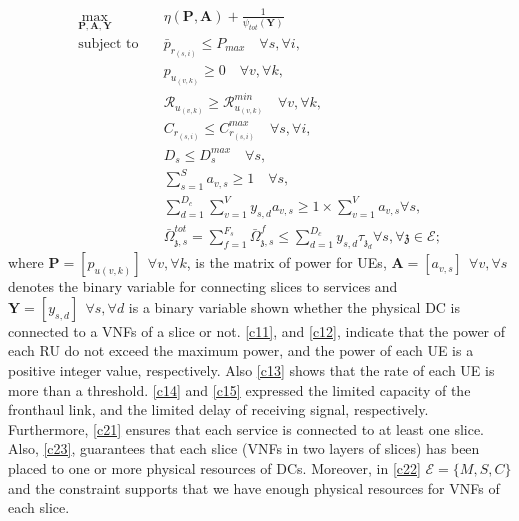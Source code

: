\documentclass[conference]{IEEEtran}
\begin{document}
\begin{subequations}
\begin{alignat}{4}
\max\limits_{\boldsymbol{P}, \boldsymbol{A}, \boldsymbol{Y} }   \quad &   \eta(\boldsymbol{P},\boldsymbol{A})+\frac{1}{\psi_{tot}(\boldsymbol{Y})} \\
\text{subject to} \quad  & \bar{p}_{r_{(s,i)}} \leq P_{max} \quad \forall s, \forall i,
 \label{c11} \\
&p_{u_{(v,k)}}  \geq 0  \quad \forall v, \forall k,\label{c12} \\
&\mathcal{R}_{u_{(v,k)}} \geq  \mathcal{R}_{u_{(v,k)}}^{min} \quad \forall v, \forall k,\label{c13} \\
&C_{r_{(s,i)}} \leq C_{r_{(s,i)}}^{max} \quad \forall s, \forall i, \label{c14}\\
&D_{s} \leq D_{s}^{max} \quad \forall s,\label{c15} \\
& \textstyle  \sum_{s=1}^{S}a_{v,s} \geq 1 \quad \forall s, \label{c21} \\
& \textstyle  \sum_{d=1}^{D_c}\sum_{v=1}^{V}y_{s,d}a_{v,s} \geq 1\times\sum_{v=1}^{V}a_{v,s} \forall s,\label{c23} \\
 &\textstyle  \bar{\Omega}_{\mathfrak{z},s}^{tot} = \sum_{f=1}^{F_s}\bar{\Omega}_{\mathfrak{z},s}^f \leq  \sum_{d=1}^{D_c} y_{s,d} \tau_{\mathfrak{z}_d}  \forall s, \forall \mathfrak{z}\in \mathcal{E}; \label{c22}
\end{alignat}
\label{constraints}
\end{subequations}
where $\boldsymbol{P} =[p_{u(v,k)}] \:\: \forall v , \forall k $, is the matrix of power for UEs, $\boldsymbol{A} =[a_{v,s}] \:\: \forall v , \forall s $ denotes the binary variable for connecting slices to services and $\boldsymbol{Y} =[y_{s,d}]  \:\: \forall s ,  \forall d $ is a binary variable shown whether
the physical DC is connected to a VNFs of a slice or not.
\eqref{c11}, and \eqref{c12}, indicate that the power of each RU do not exceed the maximum power, and the power of each UE is a positive integer value, respectively. Also \eqref{c13} shows that the rate of each UE is more than a threshold. \eqref{c14} and \eqref{c15} expressed the limited capacity of the fronthaul link, and the limited delay of receiving signal, respectively.
Furthermore, \eqref{c21}
ensures that each service is connected to at least one slice.
Also, \eqref{c23}, guarantees that each slice (VNFs in two layers of slices) has been placed to one or more physical resources of DCs. Moreover, in \eqref{c22}  $\mathcal{E} = \{M,S,C\}$ and the constraint supports
that we have enough physical resources for VNFs of each slice.\newline
\end{document}

